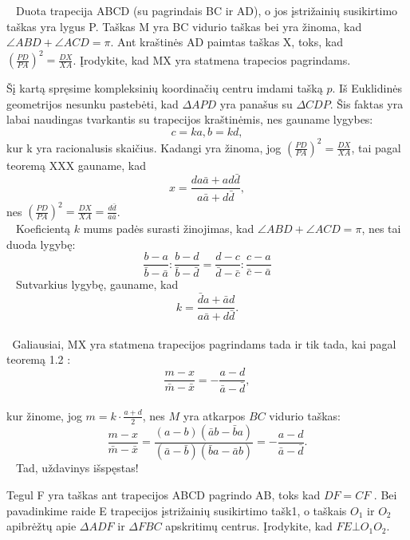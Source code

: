 \begin{pavnr}
$\phantom{a}$ Duota trapecija ABCD (su pagrindais BC ir AD), o jos įstrižainių susikirtimo taškas yra lygus P.
  Taškas M yra BC vidurio taškas bei yra žinoma, kad $ \angle ABD + \angle ACD = \pi. $ Ant kraštinės AD paimtas
taškas X, toks, kad $ ( \frac {PD}{PA})^2 = \frac {DX}{XA} $.
 Įrodykite, kad MX yra statmena trapecios pagrindams.
\end{pavnr}
\begin{sprendimas}
 Šį kartą spręsime kompleksinių koordinačių centru imdami tašką $p$. Iš Euklidinės geometrijos
nesunku pastebėti, kad $\Delta APD$ yra panašus su $ \Delta CDP$. Šis faktas yra labai naudingas tvarkantis su trapecijos kraštinėmis, nes gauname lygybes:
$$ c = ka,  b =  kd, $$
 kur k yra racionalusis skaičius.
 Kadangi yra žinoma, jog $ ( \frac {PD}{PA})^2 = \frac {DX}{XA} $, tai pagal teoremą XXX
gauname, kad 
$$ x = \frac { da \bar a + ad \bar d }{ a \bar a + d \bar d},$$
 nes $ ( \frac {PD}{PA})^2 = \frac {DX}{XA} = \frac {d \bar d} {a \bar a} $.
\\$ \phantom{a}$ Koeficientą $k$ mums padės surasti žinojimas, kad $ \angle ABD + \angle ACD = \pi $, 
nes tai duoda lygybę:
 $$ \frac {b-a}{\bar b - \bar a} : \frac { b-d}{\bar b - \bar d} =  \frac {d-c}{\bar d - \bar c} : \frac { c-a}{\bar c- \bar a} $$
$ \phantom{a}$ Sutvarkius lygybę, gauname, kad 
$$ k =  \frac { \bar d a + \bar a d }{a \bar a + d \bar d}. $$
\\ $ \phantom{a}$Galiausiai, MX yra statmena trapecijos pagrindams tada ir tik tada, kai
pagal teoremą 1.2 :
 $$  \frac {m-x}{ \bar m - \bar x} = - \frac {a - d}{ \bar a - \bar d},$$
\\kur žinome, jog $ m = k \cdot \frac { a+d} { 2} $, nes $M$ yra atkarpos $BC$ vidurio taškas:
$$ \frac {m-x}{ \bar m - \bar x}= 
\frac {(a-b)( \bar a b - \bar b a) }{(\bar a- \bar b)( \bar b a - \bar a b) } = - \frac {a - d}{ \bar a - \bar d}.$$
 $ \phantom{a}$ Tad, uždavinys išspęstas!

\end{sprendimas}
\begin{pavnr}

Tegul F yra taškas ant trapecijos ABCD pagrindo AB, toks kad $DF=CF$ . 
Bei pavadinkime raide E trapecijos įstrižainių susikirtimo tašk1, o taškais $O_1$ ir $O_2$
apibrėžtų apie $ \Delta ADF$ ir $\Delta FBC$ apskritimų centrus. 
Įrodykite, kad $ FE \bot O_1 O_2 $.
\end{pavnr}
